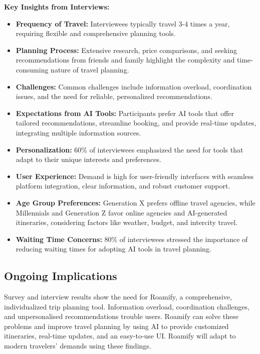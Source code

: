 \documentclass[conference]{IEEEtran}
\begin{document}
\textbf{Key Insights from Interviews:}
\begin{itemize}
    \item \textbf{Frequency of Travel:} Interviewees typically travel 3-4 times a year, requiring flexible and comprehensive planning tools.
    \item \textbf{Planning Process:} Extensive research, price comparisons, and seeking recommendations from friends and family highlight the complexity and time-consuming nature of travel planning.
    \item \textbf{Challenges:} Common challenges include information overload, coordination issues, and the need for reliable, personalized recommendations.
    \item \textbf{Expectations from AI Tools:} Participants prefer AI tools that offer tailored recommendations, streamline booking, and provide real-time updates, integrating multiple information sources.
    \item \textbf{Personalization:} 60\% of interviewees emphasized the need for tools that adapt to their unique interests and preferences.
    \item \textbf{User Experience:} Demand is high for user-friendly interfaces with seamless platform integration, clear information, and robust customer support.
    \item \textbf{Age Group Preferences:} Generation X prefers offline travel agencies, while Millennials and Generation Z favor online agencies and AI-generated itineraries, considering factors like weather, budget, and intercity travel.
    \item \textbf{Waiting Time Concerns:} 80\% of interviewees stressed the importance of reducing waiting times for adopting AI tools in travel planning.
\end{itemize}


    \subsection{Ongoing Implications}
        Survey and interview results show the need for Roamify, a comprehensive, individualized trip planning tool. Information overload, coordination challenges, and unpersonalised recommendations trouble users. Roamify can solve these problems and improve travel planning by using AI to provide customized itineraries, real-time updates, and an easy-to-use UI. Roamify will adapt to modern travelers' demands using these findings.
\end{document}
